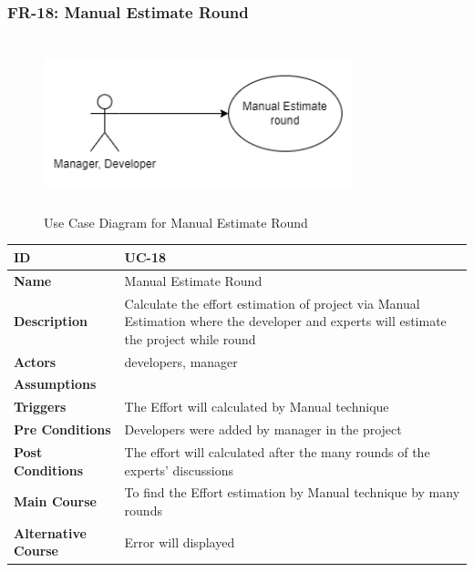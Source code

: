    \subsubsection{FR-18: Manual Estimate Round}
    \begin{figure}[H]
        \includegraphics[height=5cm, width=0.8\textwidth]{./diagrams/Use Case/u18.png}
        \centering 
        \caption{Use Case Diagram for Manual Estimate Round}
        \label{fig:Usecase1}
        \end{figure}
        
    \begin{center}
        \begin{tabularx}{\textwidth}{|l|X|}
            \hline
            \textbf{ID} & UC-18 \\
            \hline
            \textbf{Name} & Manual Estimate Round \\
            \hline
            \textbf{Description} & Calculate the effort estimation of project via Manual Estimation where the developer and experts will estimate the project while round \\
            \hline
            \textbf{Actors} & developers, manager \\
            \hline
            \textbf{Assumptions} &  \\
            \hline
            \textbf{Triggers} & The Effort will calculated by Manual technique \\
            \hline
            \textbf{Pre Conditions} & Developers were added by manager  in the project \\
            \hline
            \textbf{Post Conditions} & The effort will calculated after the many rounds of the experts' discussions  \\
            \hline
            \textbf{Main Course} & To find the Effort estimation by Manual technique by many rounds \\
            \hline
            \textbf{Alternative Course} & Error will displayed \\
            \hline
            
        \end{tabularx}
    \end{center}
    
